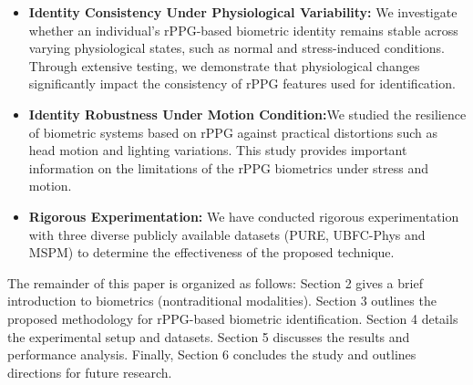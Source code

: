 \begin{itemize}
    \item \textbf{Identity Consistency Under Physiological Variability:} We investigate whether an individual’s rPPG-based biometric identity remains stable across varying physiological states, such as normal and stress-induced conditions. Through extensive testing, we demonstrate that physiological changes significantly impact the consistency of rPPG features used for identification.
    \item \textbf{Identity Robustness Under Motion Condition:}We studied the resilience of biometric systems based on rPPG against practical distortions such as head motion and lighting variations. This study provides important information on the limitations of the rPPG biometrics under stress and motion.

   \item \textbf{Rigorous Experimentation:} We have conducted rigorous experimentation with three diverse publicly available datasets (PURE, UBFC-Phys and MSPM) to determine the effectiveness of the proposed technique.

\end{itemize}




The remainder of this paper is organized as follows: Section 2 gives a brief introduction to biometrics (nontraditional modalities). Section 3 outlines the proposed methodology for rPPG-based biometric identification. Section 4 details the experimental setup and datasets. Section 5 discusses the results and performance analysis. Finally, Section 6 concludes the study and outlines directions for future research.






